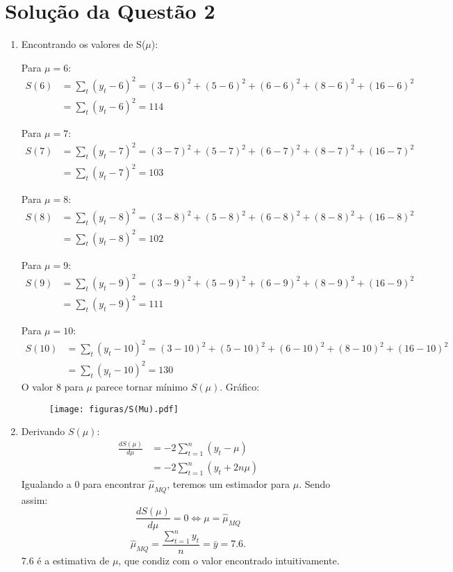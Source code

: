 \documentclass[
	12pt,				%
	openright,			%
	oneside,			%
	a4paper,			%
	english,			%
	brazil,				%
	]{abntex2}
\begin{document}
\section{Solução da Questão 2}
\begin{enumerate}[label=\alph*)]
    \item Encontrando os valores de S($\mu$):
    
    Para $\mu = 6$:
    \begin{align*}
        S(6) &= \sum \limits_{t}^{} (y_t - 6)^2 = (3 - 6)^2 + (5 - 6)^2 + (6 - 6)^2 + (8 - 6)^2 + (16 - 6)^2\\
        &= \sum \limits_{t}^{} (y_t - 6)^2 = 114
    \end{align*}
    
    Para $\mu = 7$:
    \begin{align*}
        S(7) &= \sum \limits_{t}^{} (y_t - 7)^2 = (3 - 7)^2 + (5 - 7)^2 + (6 - 7)^2 + (8 - 7)^2 + (16 - 7)^2\\
        &= \sum \limits_{t}^{} (y_t - 7)^2 = 103
    \end{align*}
    
        Para $\mu = 8$:
    \begin{align*}
        S(8) &= \sum \limits_{t}^{} (y_t - 8)^2 = (3 - 8)^2 + (5 - 8)^2 + (6 - 8)^2 + (8 - 8)^2 + (16 - 8)^2\\
        &= \sum \limits_{t}^{} (y_t - 8)^2 = 102
    \end{align*}
    
        Para $\mu = 9$:
    \begin{align*}
        S(9) &= \sum \limits_{t}^{} (y_t - 9)^2 = (3 - 9)^2 + (5 - 9)^2 + (6 - 9)^2 + (8 - 9)^2 + (16 - 9)^2\\
        &= \sum \limits_{t}^{} (y_t - 9)^2 = 111
    \end{align*}
    
    Para $\mu = 10$:
    \begin{align*}
        S(10) &= \sum \limits_{t}^{} (y_t - 10)^2 = (3 - 10)^2 + (5 - 10)^2 + (6 - 10)^2 + (8 - 10)^2 + (16 - 10)^2\\
        &= \sum \limits_{t}^{} (y_t - 10)^2 = 130
    \end{align*}
O valor 8 para $\mu$ parece tornar mínimo $S(\mu)$. Gráfico:
    \begin{figure}[H]
        \centering
        \texttt{[image: figuras/S(Mu).pdf]}
    \end{figure}
    
    \item Derivando $S(\mu)$:
    \begin{align*}
        \frac{dS(\mu)}{d\mu} &= -2 \sum \limits_{t = 1}^{n} (y_t - \mu)\\
        &= -2 \sum \limits_{t = 1}^{n} (y_t + 2n\mu)
    \end{align*}
    Igualando a 0 para encontrar $\hat{\mu}_{MQ}$, teremos um estimador para $\mu$. Sendo assim:
    $$\frac{dS(\mu)}{d\mu} = 0 \iff \mu = \hat{\mu}_{MQ}$$
    $$\hat{\mu}_{MQ} = \frac{\sum \limits_{t = 1}^{n} y_t}{n} = \bar{y} = 7.6.$$
    7.6 é a estimativa de $\mu$, que condiz com o valor encontrado intuitivamente.
    
\end{enumerate}
\end{document}
